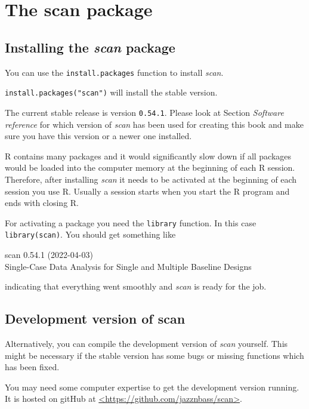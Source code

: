 \documentclass[
]{book}
\begin{document}
\hypertarget{the-scan-package}{%
\chapter{The scan package}\label{the-scan-package}}

\hypertarget{installing-the-scan-package}{%
\section{\texorpdfstring{Installing the \emph{scan} package}{Installing the scan package}}\label{installing-the-scan-package}}

You can use the \texttt{install.packages} function to install \emph{scan}.

\texttt{install.packages("scan")} will install the stable version.

The current stable release is version \texttt{0.54.1}. Please look at Section \emph{Software reference} for which version of \emph{scan} has been used for creating this book and make sure you have this version or a newer one installed.

R contains many packages and it would significantly slow down if all packages would be loaded into the computer memory at the beginning of each R session. Therefore, after installing \emph{scan} it needs to be activated at the beginning of each session you use R. Usually a session starts when you start the R program and ends with closing R.

For activating a package you need the \texttt{library} function. In this case \texttt{library(scan)}. You should get something like

scan 0.54.1 (2022-04-03)\\
Single-Case Data Analysis for Single and Multiple Baseline Designs

indicating that everything went smoothly and \emph{scan} is ready for the job.

\hypertarget{development-version-of-scan}{%
\section{Development version of scan}\label{development-version-of-scan}}

Alternatively, you can compile the development version of \emph{scan} yourself. This might be necessary if the stable version has some bugs or missing functions which has been fixed.

You may need some computer expertise to get the development version running. It is hosted on gitHub at \href{https://github.com/jazznbass/scan}{\textless https://github.com/jazznbass/scan\textgreater{}}.
\end{document}

